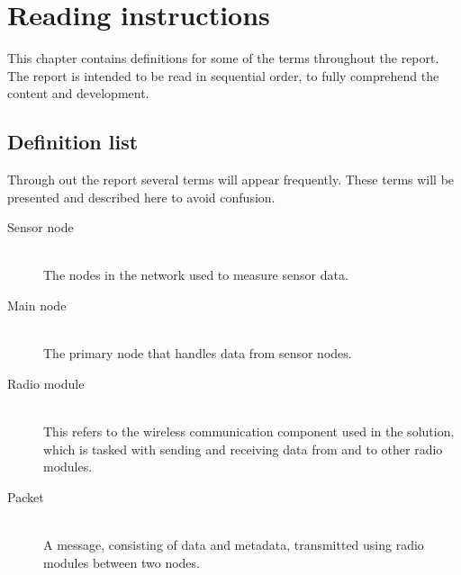 \chapter{Reading instructions}
This chapter contains definitions for some of the terms throughout the report. The report is intended to be read in sequential order, to fully comprehend the content and development.

\section*{Definition list}
Through out the report several terms will appear frequently. These terms will be presented and described here to avoid confusion. 

\begin{description}

\item[Sensor node] \hfill \\
The nodes in the network used to measure sensor data.

\item[Main node] \hfill \\
The primary node that handles data from sensor nodes.

\item[Radio module] \hfill \\
This refers to the wireless communication component used in the solution, which is tasked with sending and receiving data from and to other radio modules.

\item[Packet] \hfill \\
A message, consisting of data and metadata, transmitted using radio modules between two nodes.

\end{description}
